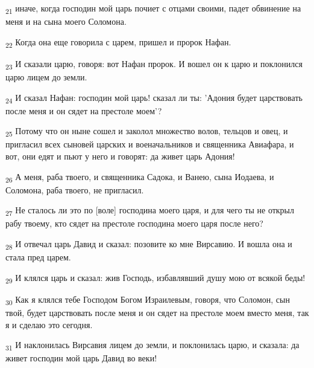\begin{tcolorbox}
\textsubscript{21} иначе, когда господин мой царь почиет с отцами своими, падет обвинение на меня и на сына моего Соломона.
\end{tcolorbox}
\begin{tcolorbox}
\textsubscript{22} Когда она еще говорила с царем, пришел и пророк Нафан.
\end{tcolorbox}
\begin{tcolorbox}
\textsubscript{23} И сказали царю, говоря: вот Нафан пророк. И вошел он к царю и поклонился царю лицем до земли.
\end{tcolorbox}
\begin{tcolorbox}
\textsubscript{24} И сказал Нафан: господин мой царь! сказал ли ты: 'Адония будет царствовать после меня и он сядет на престоле моем'?
\end{tcolorbox}
\begin{tcolorbox}
\textsubscript{25} Потому что он ныне сошел и заколол множество волов, тельцов и овец, и пригласил всех сыновей царских и военачальников и священника Авиафара, и вот, они едят и пьют у него и говорят: да живет царь Адония!
\end{tcolorbox}
\begin{tcolorbox}
\textsubscript{26} А меня, раба твоего, и священника Садока, и Ванею, сына Иодаева, и Соломона, раба твоего, не пригласил.
\end{tcolorbox}
\begin{tcolorbox}
\textsubscript{27} Не сталось ли это по [воле] господина моего царя, и для чего ты не открыл рабу твоему, кто сядет на престоле господина моего царя после него?
\end{tcolorbox}
\begin{tcolorbox}
\textsubscript{28} И отвечал царь Давид и сказал: позовите ко мне Вирсавию. И вошла она и стала пред царем.
\end{tcolorbox}
\begin{tcolorbox}
\textsubscript{29} И клялся царь и сказал: жив Господь, избавлявший душу мою от всякой беды!
\end{tcolorbox}
\begin{tcolorbox}
\textsubscript{30} Как я клялся тебе Господом Богом Израилевым, говоря, что Соломон, сын твой, будет царствовать после меня и он сядет на престоле моем вместо меня, так я и сделаю это сегодня.
\end{tcolorbox}
\begin{tcolorbox}
\textsubscript{31} И наклонилась Вирсавия лицем до земли, и поклонилась царю, и сказала: да живет господин мой царь Давид во веки!
\end{tcolorbox}
